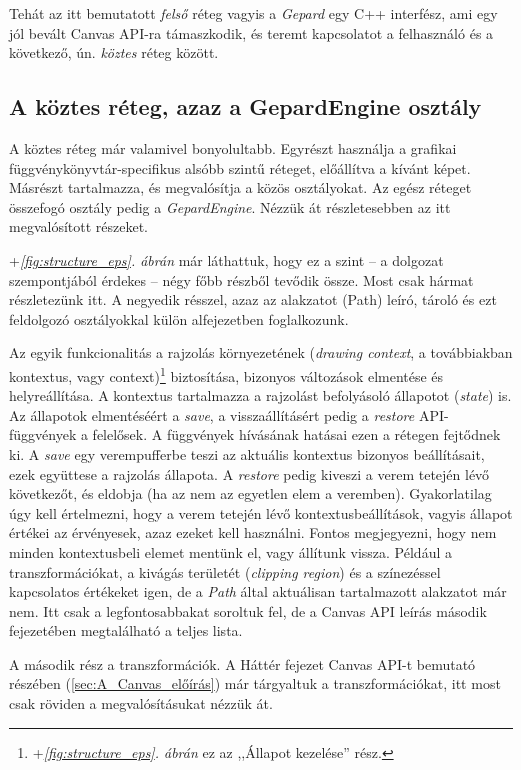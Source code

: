 \documentclass[12pt]{report}
\theoremstyle{definition}
\newcommand{\inenglish}[1]{\textsl{#1}}
\newcommand{\func}[1]{{\textsl{#1}}}
\begin{document}
Tehát az itt bemutatott \emph{felső} réteg vagyis a \func{Gepard} egy C++
interfész, ami egy jól bevált Canvas API-ra támaszkodik, és teremt kapcsolatot
a felhasználó és a következő, ún. \emph{köztes} réteg között.

    \subsection*{A köztes réteg, azaz a GepardEngine osztály}

A köztes réteg már valamivel bonyolultabb. Egyrészt használja a grafikai
függ\-vény\-könyv\-tár-spe\-ci\-fi\-kus alsóbb szintű réteget, előállítva a
kívánt képet. Másrészt tartalmazza, és megvalósítja a közös osztályokat. Az
egész réteget összefogó osztály pedig a \func{GepardEngine}. Nézzük át
részletesebben az itt megvalósított részeket.

\Az+\emph{\ref{fig:structure_eps}. ábrán} már láthattuk, hogy ez a szint -- a
dolgozat szempontjából érdekes -- négy főbb részből tevődik össze. Most csak
hármat részletezünk itt. A negyedik résszel, azaz az alakzatot (Path) leíró,
tároló és ezt feldolgozó osztályokkal külön alfejezetben foglalkozunk.

Az egyik funkcionalitás a rajzolás környezetének (\inenglish{drawing context},
a továbbiakban kontextus, vagy
context)\footnote{\Az+\emph{\ref{fig:structure_eps}. ábrán} ez az ,,Állapot
kezelése'' rész.} biztosítása, bizonyos változások elmentése és helyreállítása.
A kontextus tartalmazza a rajzolást befolyásoló állapotot (\inenglish{state})
is. Az állapotok elmentéséért a \func{save}, a visszaállításért pedig a
\func{restore} API-függvények a felelősek. A függvények hívásának hatásai ezen
a rétegen fejtődnek ki. A \func{save} egy verempufferbe teszi az aktuális
kontextus bizonyos beállításait, ezek együttese a rajzolás állapota. A
\func{restore} pedig kiveszi a verem tetején lévő következőt, és eldobja (ha az
nem az egyetlen elem a veremben). Gyakorlatilag úgy kell értelmezni, hogy a
verem tetején lévő kontextusbeállítások, vagyis állapot értékei az érvényesek,
azaz ezeket kell használni. Fontos megjegyezni, hogy nem minden kontextusbeli
elemet mentünk el, vagy állítunk vissza. Például a transzformációkat, a kivágás
területét (\inenglish{clipping region}) és a színezéssel kapcsolatos értékeket
igen, de a \func{Path} által aktuálisan tartalmazott alakzatot már nem. Itt
csak a legfontosabbakat soroltuk fel, de a Canvas API leírás
második fejezetében megtalálható a teljes lista.

A második rész a transzformációk. A Háttér fejezet Canvas API-t bemutató
részében (\ref{sec:A_Canvas_előírás})  már tárgyaltuk a transzformációkat, itt
most csak röviden a megvalósításukat nézzük át.
\end{document}
